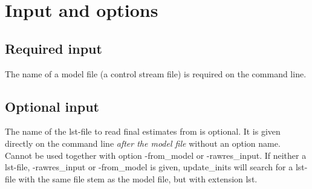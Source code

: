 \section{Input and options}

\subsection{Required input}
The name of a model file (a control stream file) is required on the command line.

\subsection{Optional input}
The name of the lst-file to read final estimates from is optional. It is given directly on the command line \emph{after the model file} without an option name. Cannot be used together with option -from\_model or -rawres\_input. If neither a lst-file, -rawres\_input or -from\_model is given, update\_inits will search for a lst-file with the same file stem as the model file, but with extension lst.

